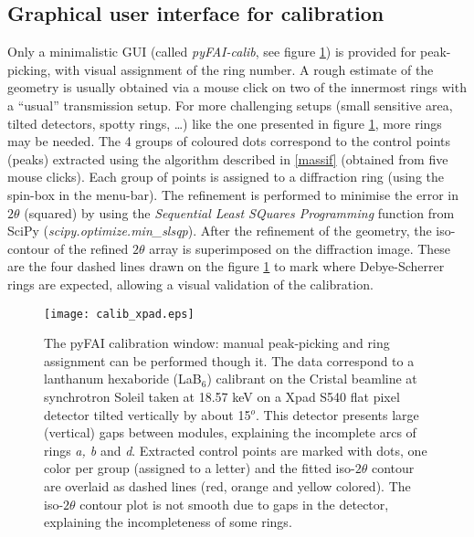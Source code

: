 \documentclass{iucr}
\begin{document}
\subsection{Graphical user interface for calibration}
\label{gui_calib}
Only a minimalistic GUI (called
\textit{pyFAI-calib}, see figure \ref{calib}) is provided
for peak-picking, with visual assignment of the ring number.
A rough estimate of the geometry is usually obtained via a mouse click on
two of the innermost rings with a ``usual'' transmission setup. 
For more challenging setups (small sensitive area, tilted detectors, spotty
rings, \ldots) like the one presented in figure \ref{calib}, more rings may
be needed.
The 4 groups of coloured dots correspond to the control points (peaks) extracted
using the algorithm described in \ref{massif} (obtained from five mouse
clicks). Each group of points is assigned to a diffraction ring (using the
spin-box in the menu-bar).
The refinement is performed to minimise the error in $2\theta$ (squared) by
using the \textit{Sequential Least SQuares Programming} function from
SciPy (\textit{scipy.optimize.min\_slsqp}).
After the refinement of the geometry, the iso-contour of the refined $2\theta$ array is
superimposed on the diffraction image.
These are the four dashed lines
drawn on the figure \ref{calib} to mark where Debye-Scherrer rings are
expected, allowing a visual validation of the calibration.

\begin{figure}
\label{calib}
\begin{center}
\texttt{[image: calib\_xpad.eps]}
\caption{The pyFAI calibration window: manual peak-picking and
ring assignment can be performed though it.
The data correspond to a lanthanum hexaboride (LaB$_6$) calibrant on the Cristal
beamline at synchrotron Soleil taken at 18.57 keV on a Xpad S540 flat pixel
detector tilted vertically by about 15$^o$.
This detector presents large (vertical) gaps between modules, explaining the
incomplete arcs of rings \textit{a, b} and \textit{d}.
Extracted control points are marked with dots, one color per group (assigned to
a letter) and the fitted iso-$2\theta$ contour are overlaid as dashed lines
(red, orange and yellow colored).
The iso-$2\theta$ contour plot is not smooth due to gaps in the
detector, explaining the incompleteness of some rings.}
\end{center}
\end{figure}
\end{document}
